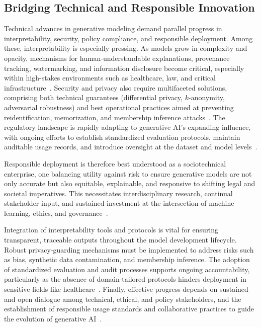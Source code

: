 \documentclass[sigconf]{acmart}
\begin{document}
\subsection{Bridging Technical and Responsible Innovation}

Technical advances in generative modeling demand parallel progress in interpretability, security, policy compliance, and responsible deployment. Among these, interpretability is especially pressing. As models grow in complexity and opacity, mechanisms for human-understandable explanations, provenance tracking, watermarking, and information disclosure become critical, especially within high-stakes environments such as healthcare, law, and critical infrastructure~\cite{ref87,ref88,ref89}. Security and privacy also require multifaceted solutions, comprising both technical guarantees (differential privacy, $k$-anonymity, adversarial robustness) and best operational practices aimed at preventing reidentification, memorization, and membership inference attacks~\cite{ref88,ref89,ref91,ref99}. The regulatory landscape is rapidly adapting to generative AI's expanding influence, with ongoing efforts to establish standardized evaluation protocols, maintain auditable usage records, and introduce oversight at the dataset and model levels~\cite{ref82,ref87,ref89,ref90,ref91}.

Responsible deployment is therefore best understood as a sociotechnical enterprise, one balancing utility against risk to ensure generative models are not only accurate but also equitable, explainable, and responsive to shifting legal and societal imperatives. This necessitates interdisciplinary research, continual stakeholder input, and sustained investment at the intersection of machine learning, ethics, and governance~\cite{ref87,ref88,ref89,ref90}.

Integration of interpretability tools and protocols is vital for ensuring transparent, traceable outputs throughout the model development lifecycle. Robust privacy-guarding mechanisms must be implemented to address risks such as bias, synthetic data contamination, and membership inference. The adoption of standardized evaluation and audit processes supports ongoing accountability, particularly as the absence of domain-tailored protocols hinders deployment in sensitive fields like healthcare~\cite{ref89,ref91}. Finally, effective progress depends on sustained and open dialogue among technical, ethical, and policy stakeholders, and the establishment of responsible usage standards and collaborative practices to guide the evolution of generative AI~\cite{ref87,ref88,ref89}.
\end{document}
